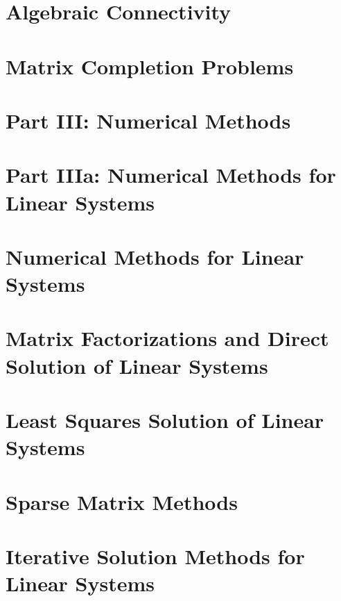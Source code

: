 \documentclass[a4paper]{article}
\begin{document}
\section{Algebraic Connectivity}

\section{Matrix Completion Problems}

\section*{Part III: Numerical Methods}

\section*{Part IIIa: Numerical Methods for Linear Systems}

\section{Numerical Methods for Linear Systems}

\section{Matrix Factorizations and Direct Solution of Linear Systems}

\section{Least Squares Solution of Linear Systems}

\section{Sparse Matrix Methods}

\section{Iterative Solution Methods for Linear Systems}
\end{document}
